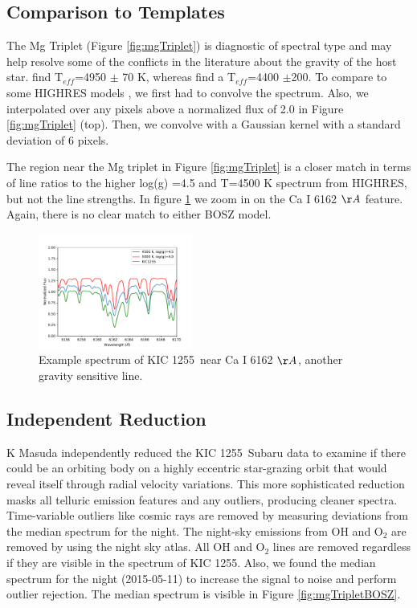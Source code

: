 \documentclass[twocolumn]{aastex61}
\newcommand{\shStar}{KIC 1255}
\begin{document}
\subsection{Comparison to Templates}

The Mg Triplet (Figure \ref{fig:mgTriplet}) is diagnostic of spectral type and may help resolve some of the conflicts in the literature about the gravity of the host star.
\citet{kawahara2013starspots} find T$_{eff}$=4950 $\pm$ 70 K, whereas \citet{rappaport} find a T$_{eff}$=4400 $\pm$200.
To compare to some HIGHRES models \citep{coelho2014hires}, we first had to convolve the spectrum.
Also, we interpolated over any pixels above a normalized flux of 2.0 in Figure \ref{fig:mgTriplet} (top).
Then, we convolve with a Gaussian kernel with a standard deviation of 6 pixels.

The region near the Mg triplet in Figure \ref{fig:mgTriplet} is a closer match in terms of line ratios to the higher log(g) =4.5 and T=4500 K spectrum from HIGHRES, but not the line strengths.
In figure \ref{fig:CaILine} we zoom in on the Ca I 6162 $\AA$ feature.
Again, there is no clear match to either BOSZ model.

\begin{figure}[!hbtp]
\begin{centering}
\includegraphics[width=0.45\textwidth]{images/subaru/CaI6162_spec.pdf}
\caption{Example spectrum of \shStar\ near Ca I 6162 $\AA$, another gravity sensitive line.}\label{fig:CaILine}
\end{centering}
\end{figure}

\subsection{Independent Reduction}
K Masuda independently reduced the \shStar\ Subaru data to examine if there could be an orbiting body on a highly eccentric star-grazing orbit that would reveal itself through radial velocity variations.
This more sophisticated reduction masks all telluric emission features and any outliers, producing cleaner spectra.
Time-variable outliers like cosmic rays are removed by measuring deviations from the median spectrum for the night.
The night-sky emissions from OH and O$_2$ are removed by using the \citet{osterbrock1996lineAtlas} night sky atlas.
All OH and O$_2$ lines are removed regardless if they are visible in the spectrum of \shStar.
Also, we found the median spectrum for the night (2015-05-11) to increase the signal to noise and perform outlier rejection.
The median spectrum is visible in Figure \ref{fig:mgTripletBOSZ}.
\end{document}
